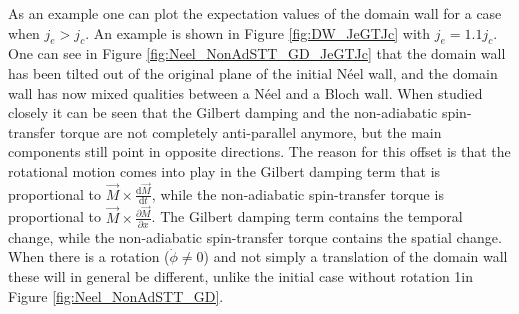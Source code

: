 \documentclass[12pt, a4paper, twoside, openright]{article}		%
\numberwithin{equation}{section}
\begin{document}
As an example one can plot the expectation values of the domain wall for a case when $j_e>j_c$. An example is shown in Figure \ref{fig:DW_JeGTJc} with $j_e = 1.1j_c$. One can see in Figure \ref{fig:Neel_NonAdSTT_GD_JeGTJc} that the domain wall has been tilted out of the original plane of the initial N\'{e}el wall, and the domain wall has now mixed qualities between a N\'{e}el and a Bloch wall. When studied closely it can be seen that the Gilbert damping and the non-adiabatic spin-transfer torque are not completely anti-parallel anymore, but the main components still point in opposite directions. The reason for this offset is that the rotational motion comes into play in the Gilbert damping term that is proportional to $\vec{M}\times\frac{\textrm{d} \vec{M}}{\textrm{d} t}$, while the non-adiabatic spin-transfer torque is proportional to $\vec{M}\times\frac{\partial \vec{M}}{\partial x}$. The Gilbert damping term contains the temporal change, while the non-adiabatic spin-transfer torque contains the spatial change. When there is a rotation ($\dot{\phi} \neq 0$) and not simply a translation of the domain wall these will in general be different, unlike the initial case without rotation 1in Figure \ref{fig:Neel_NonAdSTT_GD}.
\end{document}
